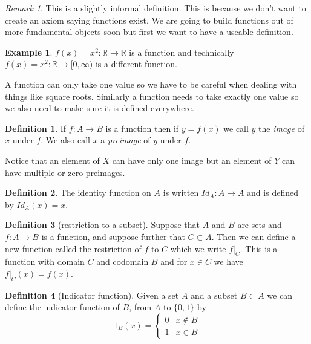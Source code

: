 \documentclass[
]{book}
\theoremstyle{definition}
\newtheorem{definition}{Definition}[chapter]
\theoremstyle{definition}
\newtheorem{example}{Example}[chapter]
\theoremstyle{definition}
\theoremstyle{definition}
\theoremstyle{remark}
\newtheorem*{remark}{Remark}
\begin{document}
\begin{remark}
This is a slightly informal definition. This is because we don't want to create an axiom saying functions exist. We are going to build functions out of more fundamental objects soon but first we want to have a useable definition.
\end{remark}

\begin{example}
\(f(x) = x^2 : \mathbb{R} \rightarrow \mathbb{R}\) is a function and technically \(f(x) = x^2: \mathbb{R} \rightarrow [0,\infty)\) is a different function.
\end{example}

A function can only take one value so we have to be careful when dealing with things like square roots. Similarly a function needs to take exactly one value so we also need to make sure it is defined everywhere.

\begin{definition}
If \(f: A \rightarrow B\) is a function then if \(y = f(x)\) we call \(y\) the \emph{image} of \(x\) under \(f\). We also call \(x\) a \emph{preimage} of \(y\) under \(f\).

Notice that an element of \(X\) can have only one image but an element of \(Y\) can have multiple or zero preimages.
\end{definition}

\begin{definition}
The identity function on \(A\) is written \(Id_A : A \rightarrow A\) and is defined by \(Id_A(x)=x\).
\end{definition}

\begin{definition}[restriction to a subset]
Suppose that \(A\) and \(B\) are sets and \(f : A \rightarrow B\) is a function, and suppose further that \(C \subset A\). Then we can define a new function called the restriction of \(f\) to \(C\) which we write \(f|_C\). This is a function with domain \(C\) and codomain \(B\) and for \(x \in C\) we have \(f|_C(x) = f(x)\).
\end{definition}

\begin{definition}[Indicator function]
Given a set \(A\) and a subset \(B \subset A\) we can define the indicator function of \(B\), from \(A\) to \(\{0,1\}\) by
\[ 1_B(x) = \left\{\begin{array}{cc} 0 & x \not\in B\\ 1 & x \in B \end{array} \right. \]
\end{definition}
\end{document}
